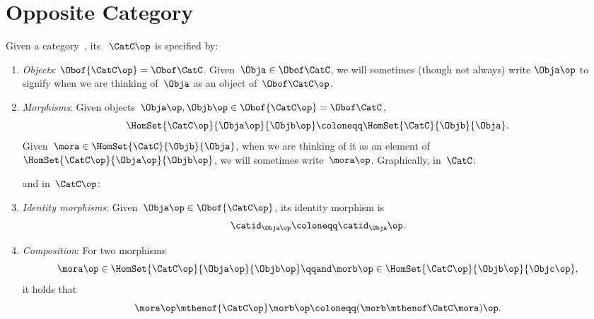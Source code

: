 
\section{Opposite Category}

\begin{ctdefinition}
	\label{def:opposite-category}
	\label{def:oppositecat}
	Given a category~\CatC, its \emph{}~$\CatC\op$ is specified by:
	\begin{enumerate}
		\item \emph{Objects}: $\Obof{\CatC\op} = \Obof\CatC$.
		      Given~$\Obja \in  \Obof\CatC$, we will sometimes (though not always) write $\Obja\op$ to signify when we are thinking of~$\Obja$ as an object of~$\Obof\CatC\op$.

		\item \emph{Morphisms}: Given objects~$\Obja\op,  \Objb\op \in \Obof{\CatC\op} = \Obof\CatC$,
		      \begin{equation}
			      \label{eq:homset-op-cat}
			      \HomSet{\CatC\op}{\Obja\op}{\Objb\op} \coloneqq \HomSet{\CatC}{\Objb}{\Obja}.
		      \end{equation}
		      Given~$\mora \in \HomSet{\CatC}{\Objb}{\Obja}$, when we are thinking of it as an element of~$\HomSet{\CatC\op}{\Obja\op}{\Objb\op}$, we will sometimes write~$\mora\op$.
		      Graphically, in~$\CatC$:
		      \begin{center}
		      \end{center}
		      and in~$\CatC\op$:
		      \begin{center}
		      \end{center}
		\item \emph{Identity morphisms}: Given~$\Obja\op \in \Obof{\CatC\op}$, its identity morphism is
		      \begin{equation}
			      \catid_{\Obja\op} \coloneqq \catid_{\Obja}\op.
		      \end{equation}
		\item \emph{Composition}: For two morphisms
		      \begin{equation}
			      \mora\op \in \HomSet{\CatC\op}{\Obja\op}{\Objb\op}
			      \qqand
			      \morb\op \in \HomSet{\CatC\op}{\Objb\op}{\Objc\op},
		      \end{equation}
		      it holds that
		      \begin{equation}
			      \mora\op \mthenof{\CatC\op} \morb\op \coloneqq (\morb \mthenof\CatC \mora)\op.
		      \end{equation}
	\end{enumerate}
\end{ctdefinition}


